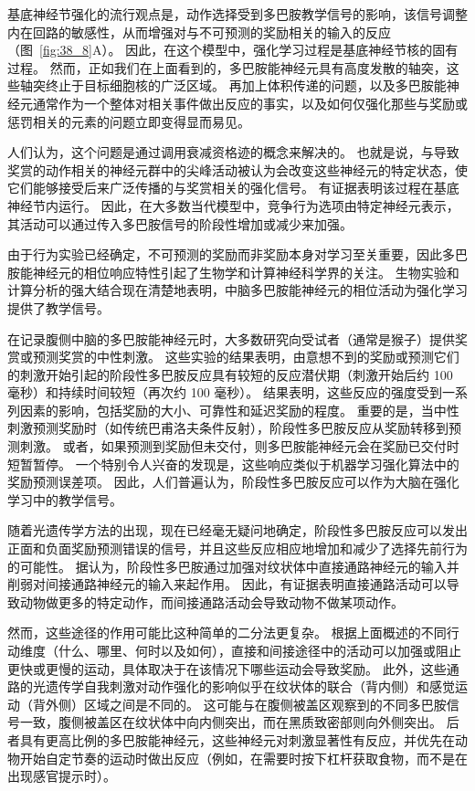 基底神经节强化的流行观点是，动作选择受到多巴胺教学信号的影响，该信号调整内在回路的敏感性，从而增强对与不可预测的奖励相关的输入的反应（图~\ref{fig:38_8}A）。
因此，在这个模型中，强化学习过程是基底神经节核的固有过程。
然而，正如我们在上面看到的，多巴胺能神经元具有高度发散的轴突，这些轴突终止于目标细胞核的广泛区域。
再加上体积传递的问题，以及多巴胺能神经元通常作为一个整体对相关事件做出反应的事实，以及如何仅强化那些与奖励或惩罚相关的元素的问题立即变得显而易见。


人们认为，这个问题是通过调用衰减资格迹的概念来解决的。
也就是说，与导致奖赏的动作相关的神经元群中的尖峰活动被认为会改变这些神经元的特定状态，使它们能够接受后来广泛传播的与奖赏相关的强化信号。
有证据表明该过程在基底神经节内运行。
因此，在大多数当代模型中，竞争行为选项由特定神经元表示，其活动可以通过传入多巴胺信号的阶段性增加或减少来加强。


由于行为实验已经确定，不可预测的奖励而非奖励本身对学习至关重要，因此多巴胺能神经元的相位响应特性引起了生物学和计算神经科学界的关注。
生物实验和计算分析的强大结合现在清楚地表明，中脑多巴胺能神经元的相位活动为强化学习提供了教学信号。


在记录腹侧中脑的多巴胺能神经元时，大多数研究向受试者（通常是猴子）提供奖赏或预测奖赏的中性刺激。
这些实验的结果表明，由意想不到的奖励或预测它们的刺激开始引起的阶段性多巴胺反应具有较短的反应潜伏期（刺激开始后约 100 毫秒）和持续时间较短（再次约 100 毫秒）。
结果表明，这些反应的强度受到一系列因素的影响，包括奖励的大小、可靠性和延迟奖励的程度。
重要的是，当中性刺激预测奖励时（如传统巴甫洛夫条件反射），阶段性多巴胺反应从奖励转移到预测刺激。 或者，如果预测到奖励但未交付，则多巴胺能神经元会在奖励已交付时短暂暂停。
一个特别令人兴奋的发现是，这些响应类似于机器学习强化算法中的奖励预测误差项。
因此，人们普遍认为，阶段性多巴胺反应可以作为大脑在强化学习中的教学信号。


随着光遗传学方法的出现，现在已经毫无疑问地确定，阶段性多巴胺反应可以发出正面和负面奖励预测错误的信号，并且这些反应相应地增加和减少了选择先前行为的可能性。
据认为，阶段性多巴胺通过加强对纹状体中直接通路神经元的输入并削弱对间接通路神经元的输入来起作用。
因此，有证据表明直接通路活动可以导致动物做更多的特定动作，而间接通路活动会导致动物不做某项动作。


然而，这些途径的作用可能比这种简单的二分法更复杂。
根据上面概述的不同行动维度（什么、哪里、何时以及如何），直接和间接途径中的活动可以加强或阻止更快或更慢的运动，具体取决于在该情况下哪些运动会导致奖励。
此外，这些通路的光遗传学自我刺激对动作强化的影响似乎在纹状体的联合（背内侧）和感觉运动（背外侧）区域之间是不同的。
这可能与在腹侧被盖区观察到的不同多巴胺信号一致，腹侧被盖区在纹状体中向内侧突出，而在黑质致密部则向外侧突出。
后者具有更高比例的多巴胺能神经元，这些神经元对刺激显著性有反应，并优先在动物开始自定节奏的运动时做出反应（例如，在需要时按下杠杆获取食物，而不是在出现感官提示时）。


